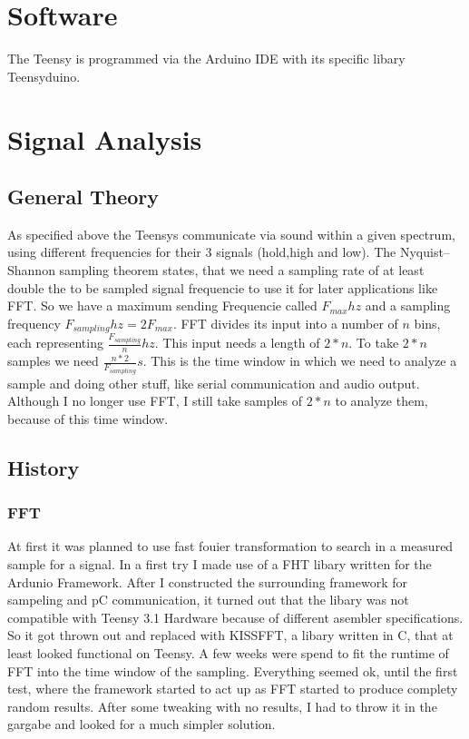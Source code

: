 \documentclass{book}
\begin{document}
\section{Software}
The Teensy is programmed via the Arduino IDE with its specific libary Teensyduino.


\section{Signal Analysis}
\subsection{General Theory}
As specified above the Teensys communicate via sound within a given spectrum, using different frequencies for their 3 signals (hold,high and low). The Nyquist–Shannon sampling theorem states, that we need a sampling rate of at least double the to be sampled signal frequencie to use it for later applications like FFT. So we have a maximum sending Frequencie called $F_{max}hz$ and a sampling frequency $F_{sampling}hz=2F_{max}$. FFT divides its input into a number of $n$ bins, each representing $\frac{F_{sampling}}{n}hz$. This input needs a length of $2*n$. To take $2*n$ samples we need $\frac{n*2}{F_{sampling}}s$. This is the time window in which we need to analyze a sample and doing other stuff, like serial communication and audio output. Although I no longer use FFT, I still take samples of $2*n$ to analyze them, because of this time window.

\subsection{History}
\subsubsection{FFT}
At first it was planned to use fast fouier transformation to search in a measured sample for a signal. In a first try I made use of a FHT libary written for the Ardunio Framework. After I constructed the surrounding framework for sampeling and pC communication, it turned out that the libary was not compatible with Teensy 3.1 Hardware because of different asembler specifications. So it got thrown out and replaced with KISSFFT, a libary written in C, that at least looked functional on Teensy.
A few weeks were spend to fit the runtime of FFT into the time window of the sampling. Everything seemed ok, until the first test, where the framework started to act up as FFT started to produce complety random results. After some tweaking with no results, I had to throw it in the gargabe and looked for a much simpler solution.
\end{document}
